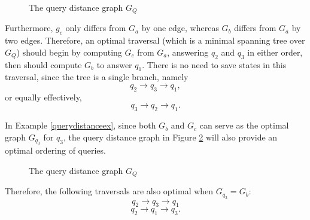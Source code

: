 \begin{example}
\begin{figure}[h!]
\centering
{}
\caption{The query distance graph $G_{Q}$}
\label{querygraphex}
\end{figure}

\null \quad \quad Furthermore, $g_{c}$ only differs from $G_{a}$ by one edge, whereas $G_{b}$ differs from $G_{a}$ by two edges. Therefore, an optimal traversal (which is a minimal spanning tree over $G_{Q}$) should begin by computing $G_{c}$ from $G_{a}$, answering $q_{2}$ and $q_{3}$ in either order, then should compute $G_{b}$ to answer $q_{1}$. There is no need to save states in this traversal, since the tree is a single branch, namely
$$q_{2} \rightarrow q_{3} \rightarrow q_{1},$$
or equally effectively,
$$q_{3} \rightarrow q_{2} \rightarrow q_{1}.$$
\end{example}

\begin{remark}
In Example \ref{querydistanceex}, since both $G_{b}$ and $G_{c}$ can serve as the optimal graph $G_{q_{3}}$ for $q_{3}$, the query distance graph in Figure \ref{querygraphex2} will also provide an optimal ordering of queries.

\begin{figure}[h!]
\centering
{}
\caption{The query distance graph $G_{Q}$}
\label{querygraphex2}
\end{figure}

Therefore, the following traversals are also optimal when $G_{q_{3}} =  G_{b}$: 
$$q_{2} \rightarrow q_{3} \rightarrow q_{1}$$
$$q_{2} \rightarrow q_{1} \rightarrow q_{3}.$$
\end{remark}

